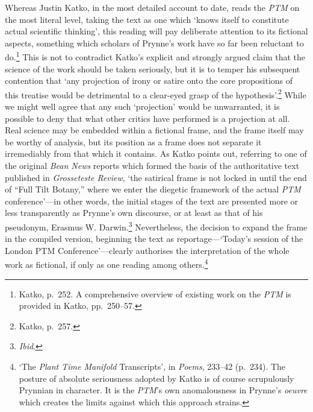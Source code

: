 \documentclass[]{article}
\begin{document}
Whereas Justin Katko, in the most detailed account to date, reads the
\emph{PTM} on the most literal level, taking the text as one which
‘knows itself to constitute actual scientific thinking’, this reading
will pay deliberate attention to its fictional aspects, something which
scholars of Prynne’s work have so far been reluctant to do.\footnote{Katko,
  p.~252. A comprehensive overview of existing work on the \emph{PTM} is
  provided in Katko, pp.~250–57.} This is not to contradict Katko’s
explicit and strongly argued claim that the science of the work should
be taken seriously, but it is to temper his subsequent contention that
‘any projection of irony or satire onto the core propositions of this
treatise would be detrimental to a clear-eyed grasp of the
hypothesis’.\footnote{Katko, p.~257.} While we might well agree that any
such ‘projection’ would be unwarranted, it is possible to deny that what
other critics have performed is a projection at all. Real science may be
embedded within a fictional frame, and the frame itself may be worthy of
analysis, but its position as a frame does not separate it irremediably
from that which it contains. As Katko points out, referring to one of
the original \emph{Bean News} reports which formed the basis of the
authoritative text published in \emph{Grosseteste Review}, ‘the
satirical frame is not locked in until the end of “Full Tilt Botany,”
where we enter the diegetic framework of the actual \emph{PTM}
conference’—in other words, the initial stages of the text are presented
more or less transparently as Prynne’s own discourse, or at least as
that of his pseudonym, Erasmus W. Darwin.\footnote{\emph{Ibid}.}
Nevertheless, the decision to expand the frame in the compiled version,
beginning the text as reportage—‘Today’s session of the London PTM
Conference’—clearly authorises the interpretation of the whole work as
fictional, if only as one reading among others.\footnote{‘The
  \emph{Plant Time Manifold} Transcripts’, in \emph{Poems}, 233–42
  (p.~234). The posture of absolute seriousness adopted by Katko is of
  course scrupulously Prynnian in character. It is the \emph{PTM}’s own
  anomalousness in Prynne’s \emph{oeuvre} which creates the limits
  against which this approach strains.}
\end{document}
